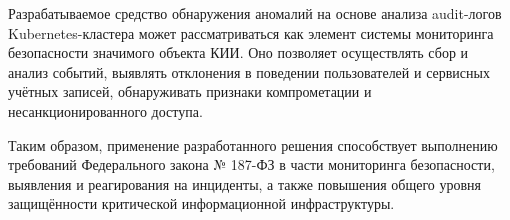 Разрабатываемое средство обнаружения аномалий на основе анализа audit-логов Kubernetes-кластера может рассматриваться как элемент системы мониторинга безопасности значимого объекта КИИ. Оно позволяет осуществлять сбор и анализ событий, выявлять отклонения в поведении пользователей и сервисных учётных записей, обнаруживать признаки компрометации и несанкционированного доступа.

Таким образом, применение разработанного решения способствует выполнению требований Федерального закона № 187-ФЗ в части мониторинга безопасности, выявления и реагирования на инциденты, а также повышения общего уровня защищённости критической информационной инфраструктуры.